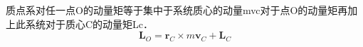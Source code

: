 质点系对任一点O的动量矩等于集中于系统质心的动量mvc对于点O的动量矩再加上此系统对于质心C的动量矩Lc．
\begin{equation}
\mathbf{L}_O=\mathbf{r}_C\times m \mathbf{v}_C+ \mathbf{L}_C
\end{equation}